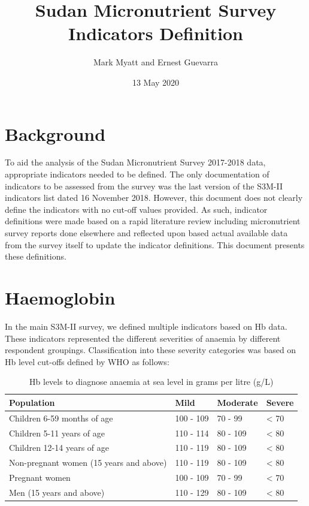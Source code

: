 \documentclass[12pt,a4paper]{article}
\title{Sudan Micronutrient Survey Indicators Definition}
\author{Mark Myatt and Ernest Guevarra}
\date{13 May 2020}
\begin{document}
\maketitle

{
\hypersetup{linkcolor=}
\setcounter{tocdepth}{3}
\tableofcontents
}
\newpage

\hypertarget{background}{%
\section{Background}\label{background}}

To aid the analysis of the Sudan Micronutrient Survey 2017-2018 data, appropriate indicators needed to be defined. The only documentation of indicators to be assessed from the survey was the last version of the S3M-II indicators list dated 16 November 2018. However, this document does not clearly define the indicators with no cut-off values provided. As such, indicator definitions were made based on a rapid literature review including micronutrient survey reports done elsewhere and reflected upon based actual available data from the survey itself to update the indicator definitions. This document presents these definitions.

\hypertarget{haemoglobin}{%
\section{Haemoglobin}\label{haemoglobin}}

In the main S3M-II survey, we defined multiple indicators based on Hb data. These indicators represented the different severities of anaemia by different respondent groupings. Classification into these severity categories was based on Hb level cut-offs defined by WHO \citep{WorldHealthOrganization:2007tx, WorldHealthOrganization:2011ut} as follows:

\begin{table}[H]

\caption{\label{tab:hb1}Hb levels to diagnose anaemia at sea level in grams per litre (g/L)}
\centering
\begin{tabular}[t]{llll}
\toprule
\textbf{Population} & \textbf{Mild} & \textbf{Moderate} & \textbf{Severe}\\
\midrule
\rowcolor{gray!6}  Children 6-59 months of age & 100 - 109 & 70 - 99 & < 70\\
Children 5-11 years of age & 110 - 114 & 80 - 109 & < 80\\
\rowcolor{gray!6}  Children 12-14 years of age & 110 - 119 & 80 - 109 & < 80\\
Non-pregnant women
(15 years and above) & 110 - 119 & 80 - 109 & < 80\\
\rowcolor{gray!6}  Pregnant women & 100 - 109 & 70 - 99 & < 70\\
\addlinespace
Men
(15 years and above) & 110 - 129 & 80 - 109 & < 80\\
\bottomrule
\end{tabular}
\end{table}
\end{document}
